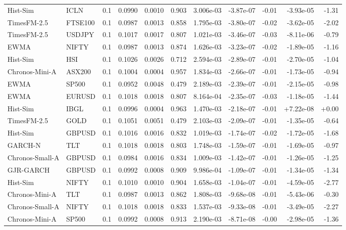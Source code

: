 \begin{tabular}{llrrrrrrrrr}
Hist-Sim & ICLN & 0.1 & 0.0990 & 0.0010 & 0.903 & 3.006e-03 & -3.87e-07 & -0.01 & -3.93e-05 & -1.31 \\
TimesFM-2.5 & FTSE100 & 0.1 & 0.0987 & 0.0013 & 0.858 & 1.795e-03 & -3.80e-07 & -0.02 & -3.62e-05 & -2.02 \\
TimesFM-2.5 & USDJPY & 0.1 & 0.1017 & 0.0017 & 0.807 & 1.021e-03 & -3.46e-07 & -0.03 & -8.11e-06 & -0.79 \\
EWMA & NIFTY & 0.1 & 0.0987 & 0.0013 & 0.874 & 1.626e-03 & -3.23e-07 & -0.02 & -1.89e-05 & -1.16 \\
Hist-Sim & HSI & 0.1 & 0.1026 & 0.0026 & 0.712 & 2.594e-03 & -2.89e-07 & -0.01 & -2.70e-05 & -1.04 \\
Chronos-Mini-A & ASX200 & 0.1 & 0.1004 & 0.0004 & 0.957 & 1.834e-03 & -2.66e-07 & -0.01 & -1.73e-05 & -0.94 \\
EWMA & SP500 & 0.1 & 0.0952 & 0.0048 & 0.479 & 2.189e-03 & -2.39e-07 & -0.01 & -2.15e-05 & -0.98 \\
EWMA & EURUSD & 0.1 & 0.1018 & 0.0018 & 0.807 & 8.164e-04 & -2.35e-07 & -0.03 & -1.18e-05 & -1.44 \\
Hist-Sim & IBGL & 0.1 & 0.0996 & 0.0004 & 0.963 & 1.470e-03 & -2.18e-07 & -0.01 & +7.22e-08 & +0.00 \\
TimesFM-2.5 & GOLD & 0.1 & 0.1051 & 0.0051 & 0.479 & 2.103e-03 & -2.09e-07 & -0.01 & -1.35e-05 & -0.64 \\
Hist-Sim & GBPUSD & 0.1 & 0.1016 & 0.0016 & 0.832 & 1.019e-03 & -1.74e-07 & -0.02 & -1.72e-05 & -1.68 \\
GARCH-N & TLT & 0.1 & 0.1018 & 0.0018 & 0.803 & 1.748e-03 & -1.59e-07 & -0.01 & -1.69e-05 & -0.97 \\
Chronos-Small-A & GBPUSD & 0.1 & 0.0984 & 0.0016 & 0.834 & 1.009e-03 & -1.42e-07 & -0.01 & -1.26e-05 & -1.25 \\
GJR-GARCH & GBPUSD & 0.1 & 0.0992 & 0.0008 & 0.909 & 9.986e-04 & -1.09e-07 & -0.01 & -1.34e-05 & -1.34 \\
Hist-Sim & NIFTY & 0.1 & 0.1010 & 0.0010 & 0.904 & 1.658e-03 & -1.04e-07 & -0.01 & -4.59e-05 & -2.77 \\
Chronos-Mini-A & TLT & 0.1 & 0.0987 & 0.0013 & 0.862 & 1.808e-03 & -9.68e-08 & -0.01 & -5.43e-06 & -0.30 \\
Chronos-Small-A & NIFTY & 0.1 & 0.1018 & 0.0018 & 0.833 & 1.537e-03 & -9.33e-08 & -0.01 & -3.49e-05 & -2.27 \\
Chronos-Mini-A & SP500 & 0.1 & 0.0992 & 0.0008 & 0.913 & 2.190e-03 & -8.71e-08 & -0.00 & -2.98e-05 & -1.36 \\

\end{tabular}
